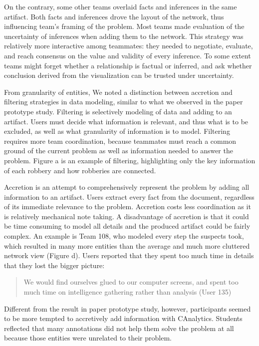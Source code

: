 On the contrary, some other teams overlaid facts and inferences in the
same artifact. Both facts and inferences drove the layout of the
network, thus influencing team's framing of the problem. Most teams made
evaluation of the uncertainty of inferences when adding them to the
network. This strategy was relatively more interactive among teammates:
they needed to negotiate, evaluate, and reach consensus on the value and
validity of every inference. To some extent teams might forget whether a
relationship is factual or inferred, and ask whether conclusion derived
from the visualization can be trusted under uncertainty.

From granularity of entities, We noted a distinction between accretion
and filtering strategies in data modeling, similar to what we observed
in the paper prototype study. Filtering is selectively modeling of data
and adding to an artifact. Users must decide what information is
relevant, and thus what is to be excluded, as well as what granularity
of information is to model. Filtering requires more team coordination,
because teammates must reach a common ground of the current problem as
well as information needed to answer the problem. Figure
\autocite{fig:network}a is an example of filtering, highlighting only
the key information of each robbery and how robberies are connected.

Accretion is an attempt to comprehensively represent the problem by
adding all information to an artifact. Users extract every fact from the
document, regardless of its immediate relevance to the problem.
Accretion costs less coordination as it is relatively mechanical note
taking. A disadvantage of accretion is that it could be time consuming
to model all details and the produced artifact could be fairly complex.
An example is Team 108, who modeled every step the suspects took, which
resulted in many more entities than the average and much more cluttered
network view (Figure \autocite{fig:network}d). Users reported that they
spent too much time in details that they lost the bigger picture:

\begin{quote}
	We would find ourselves glued to our computer screens, and spent too
	much time on intelligence gathering rather than analysis (User 135)
\end{quote}

Different from the result in paper prototype study, however,
participants seemed to be more tempted to accretively add information
with CAnalytics. Students reflected that many annotations did not help
them solve the problem at all because those entities were unrelated to
their problem.

